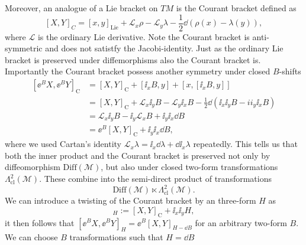 Moreover, an analogue of a Lie bracket on $TM$ is the Courant bracket defined as 
\begin{equation}
    \left[X,Y\right]_C = [x,y]_{\text{Lie}}+\mathcal{L}_x\rho-\mathcal{L}_y\lambda -\frac{1}{2}\dd\left(\rho(x)-\lambda(y)\right),
\end{equation}
where $\mathcal{L}$ is the ordinary Lie derivative. Note the Courant bracket is anti-symmetric and does not satistfy the Jacobi-identity.  Just as the ordinary Lie bracket is preserved under diffemorphisms also the Courant bracket is. Importantly the Courant bracket possess another symmetry under closed $B$-shifts 
\begin{equation}
    \begin{aligned}
        \left[\ee^B X,\ee^B Y\right]_{\text{C}} &= [X,Y]_{\text{C}}+[\ii_xB,y]+[x,[\ii_xB,y]]\\
                        &=[X,Y]_{\text{C}}+ \mathcal{L}_{x}\ii_yB-\mathcal{L}_{y}\ii_xB-\frac{1}{2}\dd\left(\ii_x\ii_yB-ii_y\ii_xB\right)\\
                        &= \mathcal{L}_x\ii_y B-\ii_y\mathcal{L}_xB+\ii_y\ii_x \dd B\\
                        &= \ee^B[X,Y]_{\text{C}}+\ii_y\ii_x \dd B,
    \end{aligned}
\end{equation}
where we used Cartan's identity $\mathcal{L}_x\lambda = \ii_x\dd\lambda+\dd\ii_x\lambda$ repeatedly. This tells us that both the inner product and the Courant bracket is preserved not only by diffeomorphism $\text{Diff}(\mathcal{M})$, but also under closed two-form transformations $\Lambda^2_{\text{cl}}(\mathcal{M})$. These combine into the semi-direct product of transformations 
\begin{equation}
    \text{Diff}(\mathcal{M})\ltimes\Lambda^2_{\text{cl}}(\mathcal{M}).
\end{equation}
We can introduce a twisting of the Courant bracket by an three-form $H$ as 
\begin{equation}
    [X,Y]_{H} := [X,Y]_{\text{C}}+\ii_x\ii_y H,
\end{equation}
it then follows that $[\ee^BX,\ee^BY]_{H}=\ee^{B}[X,Y]_{H-\dd B}$ for an arbitrary two-form $B$. We can choose $B$ transformations such that $H=\dd B$

